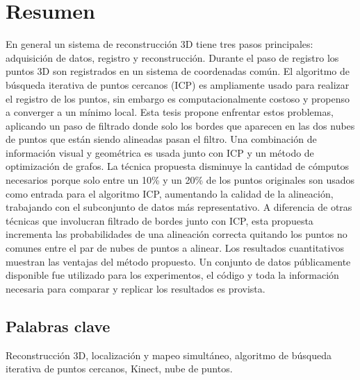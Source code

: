 
\chapter*{Resumen}

En general un sistema de reconstrucci\'on 3D tiene tres pasos principales: adquisici\'on de datos, registro y reconstrucci\'on. Durante el paso de registro los puntos 3D son registrados en un sistema de coordenadas com\'un. El algoritmo de b\'usqueda iterativa de puntos cercanos (ICP) es 
ampliamente usado para realizar el registro de los puntos, sin embargo es computacionalmente costoso y propenso a converger a un m\'inimo local. Esta tesis propone enfrentar estos problemas, aplicando un paso de filtrado donde solo los bordes que aparecen en las dos nubes de puntos 
que est\'an siendo alineadas pasan el filtro. Una combinaci\'on de informaci\'on visual y geom\'etrica es 
usada junto con ICP y un m\'etodo de optimizaci\'on de grafos. 
La t\'ecnica propuesta 
disminuye la cantidad de c\'omputos necesarios porque solo entre un 10\% y un 20\% de los puntos originales son usados 
como entrada para el algoritmo ICP, 
aumentando la calidad de la alineaci\'on, trabajando con el subconjunto de datos m\'as representativo. A diferencia de otras 
t\'ecnicas que involucran filtrado de bordes junto con ICP, esta propuesta incrementa las probabilidades de una alineaci\'on 
correcta quitando los puntos no comunes entre el par de nubes de puntos a alinear. Los resultados cuantitativos muestran 
las ventajas del m\'etodo propuesto. Un conjunto de datos p\'ublicamente disponible fue utilizado para los experimentos, el c\'odigo 
y toda la informaci\'on necesaria para comparar y replicar los resultados es provista.


\section*{Palabras clave}


Reconstrucci\'on 3D, localizaci\'on y mapeo simult\'aneo, algoritmo de b\'usqueda iterativa de puntos cercanos, Kinect, nube de puntos.
